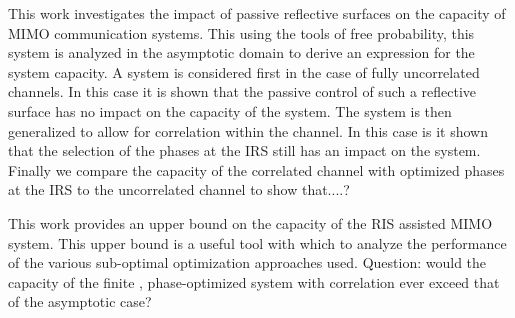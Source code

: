 This work investigates the impact of passive reflective surfaces on the capacity of MIMO communication systems. This using the tools of free probability, this system is analyzed in the asymptotic domain to derive an expression for the system capacity. 
A system is considered first in the case of fully uncorrelated channels. In this case it is shown that the passive control of such a reflective surface has no impact on the capacity of the system. The system is then generalized to allow for correlation within the channel. In this case is it shown that the selection of the phases at the IRS still has an impact on the system. Finally we compare the capacity of the correlated channel with optimized phases at the IRS to the uncorrelated channel to show that....?

This work provides an upper bound on the capacity of the RIS assisted MIMO system. This upper bound is a useful tool with which to analyze the performance of the various sub-optimal optimization approaches used. 
Question: would the capacity of the finite , phase-optimized system with correlation ever exceed that of the asymptotic case?